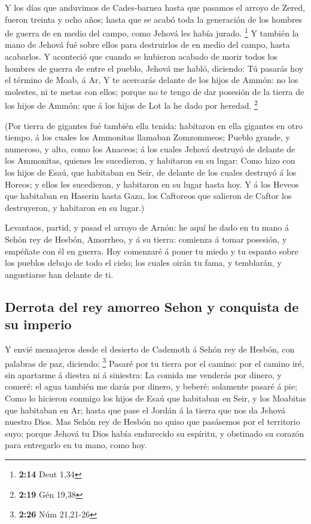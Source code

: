  Y los días que anduvimos de Cades-barnea hasta que
pasamos el arroyo de Zered, fueron treinta y ocho años; hasta que se
acabó toda la generación de los hombres de guerra de en medio del campo,
como Jehová les había jurado. \footnote{\textbf{2:14} Deut 1,34}
 Y también la mano de Jehová fué sobre ellos para
destruirlos de en medio del campo, hasta acabarlos.  Y
aconteció que cuando se hubieron acabado de morir todos los hombres de
guerra de entre el pueblo,  Jehová me habló, diciendo:
 Tú pasarás hoy el término de Moab, á Ar, 
Y te acercarás delante de los hijos de Ammón: no los molestes, ni te
metas con ellos; porque no te tengo de dar posesión de la tierra de los
hijos de Ammón; que á los hijos de Lot la he dado por heredad.
\footnote{\textbf{2:19} Gén 19,38}

 (Por tierra de gigantes fué también ella tenida:
habitaron en ella gigantes en otro tiempo, á los cuales los Ammonitas
llamaban Zomzommeos;  Pueblo grande, y numeroso, y alto,
como los Anaceos; á los cuales Jehová destruyó de delante de los
Ammonitas, quienes les sucedieron, y habitaron en su lugar:
 Como hizo con los hijos de Esaú, que habitaban en Seir,
de delante de los cuales destruyó á los Horeos; y ellos les sucedieron,
y habitaron en su lugar hasta hoy.  Y á los Heveos que
habitaban en Haserin hasta Gaza, los Caftoreos que salieron de Caftor
los destruyeron, y habitaron en su lugar.)

 Levantaos, partid, y pasad el arroyo de Arnón: he aquí
he dado en tu mano á Sehón rey de Hesbón, Amorrheo, y á su tierra:
comienza á tomar posesión, y empéñate con él en guerra. 
Hoy comenzaré á poner tu miedo y tu espanto sobre los pueblos debajo de
todo el cielo; los cuales oirán tu fama, y temblarán, y angustiarse han
delante de ti.

\hypertarget{derrota-del-rey-amorreo-sehon-y-conquista-de-su-imperio}{%
\subsection{Derrota del rey amorreo Sehon y conquista de su
imperio}\label{derrota-del-rey-amorreo-sehon-y-conquista-de-su-imperio}}

 Y envié mensajeros desde el desierto de Cademoth á Sehón
rey de Hesbón, con palabras de paz, diciendo: \footnote{\textbf{2:26}
  Núm 21,21-26}  Pasaré por tu tierra por el camino: por
el camino iré, sin apartarme á diestra ni á siniestra: 
La comida me venderás por dinero, y comeré: el agua también me darás por
dinero, y beberé: solamente pasaré á pie;  Como lo
hicieron conmigo los hijos de Esaú que habitaban en Seir, y los Moabitas
que habitaban en Ar; hasta que pase el Jordán á la tierra que nos da
Jehová nuestro Dios.  Mas Sehón rey de Hesbón no quiso
que pasásemos por el territorio suyo; porque Jehová tu Dios había
endurecido su espíritu, y obstinado su corazón para entregarlo en tu
mano, como hoy.

